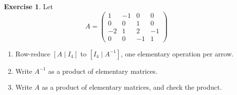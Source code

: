 \documentclass[12pt]{article}
\theoremstyle{definition}
\newtheorem{exercise}{Exercise}
\begin{document}
\begin{exercise}\label{r2-dr-elementary}
Let
\[
A=\begin{pmatrix}1&-1&0&0\\0&0&1&0\\-2&1&2&-1\\0&0&-1&1\end{pmatrix}
\]
\begin{enumerate}
\item Row-reduce \([A\mid I_4]\) to \([I_4\mid A^{-1}]\), one elementary operation per arrow.
\item Write \(A^{-1}\) as a product of elementary matrices.
\item Write \(A\) as a product of elementary matrices, and check the product.
\end{enumerate}
\end{exercise}
\end{document}
